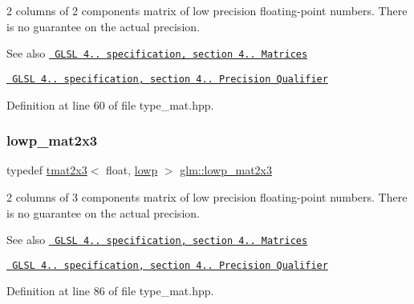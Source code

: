 2 columns of 2 components matrix of low precision floating-\/point numbers. There is no guarantee on the actual precision.

\begin{DoxySeeAlso}{See also}
\href{http://www.opengl.org/registry/doc/GLSLangSpec.4.20.8.pdf}{\texttt{ G\+L\+SL 4.. specification, section 4.. Matrices}} 

\href{http://www.opengl.org/registry/doc/GLSLangSpec.4.20.8.pdf}{\texttt{ G\+L\+SL 4.. specification, section 4.. Precision Qualifier}} 
\end{DoxySeeAlso}


Definition at line 60 of file type\+\_\+mat.\+hpp.

\mbox{\label{group__core__precision_ga9fb4a4c96e13e4954bff1af2f99408cb}} 
\subsubsection{\texorpdfstring{lowp\_mat2x3}{lowp\_mat2x3}}
{\footnotesize\ttfamily typedef \mbox{\hyperlink{structglm_1_1tmat2x3}{tmat2x3}}$<$ float, \mbox{\hyperlink{namespaceglm_a0f04f086094c747d227af4425893f545ae161af3fc695e696ce3bf69f7332bc2d}{lowp}} $>$ \mbox{\hyperlink{group__core__precision_ga9fb4a4c96e13e4954bff1af2f99408cb}{glm\+::lowp\+\_\+mat2x3}}}

2 columns of 3 components matrix of low precision floating-\/point numbers. There is no guarantee on the actual precision.

\begin{DoxySeeAlso}{See also}
\href{http://www.opengl.org/registry/doc/GLSLangSpec.4.20.8.pdf}{\texttt{ G\+L\+SL 4.. specification, section 4.. Matrices}} 

\href{http://www.opengl.org/registry/doc/GLSLangSpec.4.20.8.pdf}{\texttt{ G\+L\+SL 4.. specification, section 4.. Precision Qualifier}} 
\end{DoxySeeAlso}


Definition at line 86 of file type\+\_\+mat.\+hpp.

\mbox{\label{group__core__precision_gafb9e8f974dd69b38b5acc16989882aa0}} 
